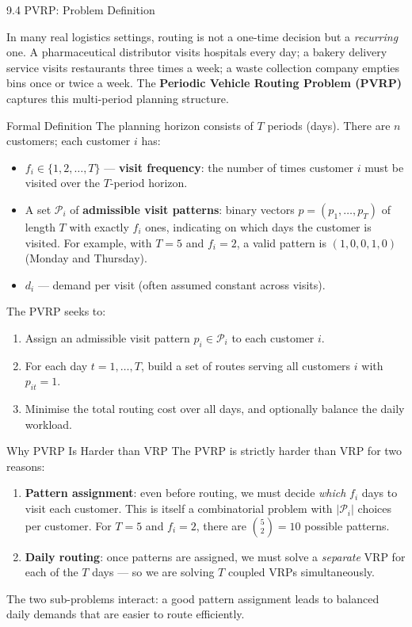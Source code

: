 \documentclass[aspectratio=169,10pt]{beamer}
\begin{document}
\begin{frame}[allowframebreaks]{9.4 PVRP: Problem Definition}

In many real logistics settings, routing is not a one-time decision but a
\emph{recurring} one.  A pharmaceutical distributor visits hospitals every
day; a bakery delivery service visits restaurants three times a week; a waste
collection company empties bins once or twice a week.  The
\textbf{Periodic Vehicle Routing Problem (PVRP)} captures this multi-period
planning structure.

\begin{block}{Formal Definition}
  The planning horizon consists of $T$ periods (days).  There are $n$
  customers; each customer $i$ has:
  \begin{itemize}
    \item $f_i \in \{1, 2, \ldots, T\}$ --- \textbf{visit frequency}: the
          number of times customer $i$ must be visited over the $T$-period
          horizon.
    \item A set $\mathcal{P}_i$ of \textbf{admissible visit patterns}: binary
          vectors $p = (p_1, \ldots, p_T)$ of length $T$ with exactly $f_i$
          ones, indicating on which days the customer is visited.  For example,
          with $T=5$ and $f_i=2$, a valid pattern is $(1,0,0,1,0)$ (Monday
          and Thursday).
    \item $d_i$ --- demand per visit (often assumed constant across visits).
  \end{itemize}
  The PVRP seeks to:
  \begin{enumerate}
    \item Assign an admissible visit pattern $p_i \in \mathcal{P}_i$ to each
          customer $i$.
    \item For each day $t = 1, \ldots, T$, build a set of routes serving all
          customers $i$ with $p_{it} = 1$.
    \item Minimise the total routing cost over all days, and optionally
          balance the daily workload.
  \end{enumerate}
\end{block}

\framebreak

\begin{block}{Why PVRP Is Harder than VRP}
  The PVRP is strictly harder than VRP for two reasons:
  \begin{enumerate}
    \item \textbf{Pattern assignment}: even before routing, we must decide
          \emph{which} $f_i$ days to visit each customer.  This is itself a
          combinatorial problem with $|\mathcal{P}_i|$ choices per customer.
          For $T=5$ and $f_i=2$, there are $\binom{5}{2}=10$ possible patterns.
    \item \textbf{Daily routing}: once patterns are assigned, we must solve a
          \emph{separate} VRP for each of the $T$ days --- so we are solving
          $T$ coupled VRPs simultaneously.
  \end{enumerate}
  The two sub-problems interact: a good pattern assignment leads to balanced
  daily demands that are easier to route efficiently.
\end{block}


\end{frame}
\end{document}
